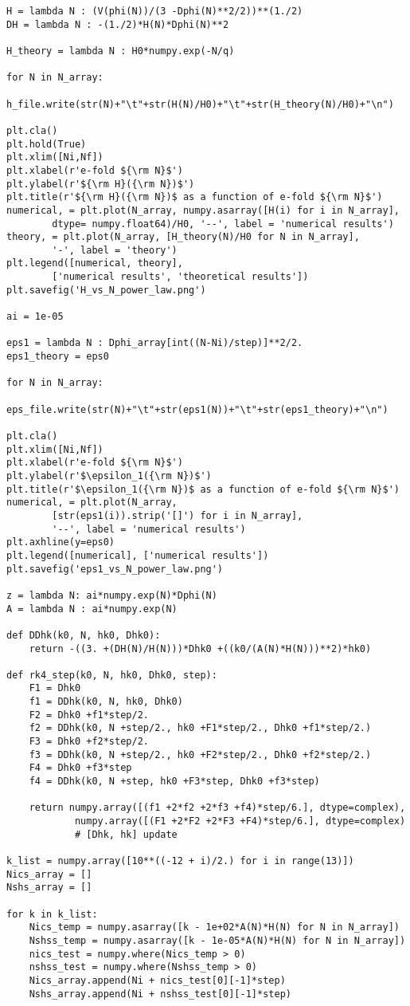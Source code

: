 \documentclass[12pt,a4paper,oneside]{book}
\begin{document}
\begin{appendices}
\begin{small}
\begin{verbatim}
H = lambda N : (V(phi(N))/(3 -Dphi(N)**2/2))**(1./2)
DH = lambda N : -(1./2)*H(N)*Dphi(N)**2

H_theory = lambda N : H0*numpy.exp(-N/q)

for N in N_array:
	h_file.write(str(N)+"\t"+str(H(N)/H0)+"\t"+str(H_theory(N)/H0)+"\n")

plt.cla()
plt.hold(True)
plt.xlim([Ni,Nf])
plt.xlabel(r'e-fold ${\rm N}$')
plt.ylabel(r'${\rm H}({\rm N})$')
plt.title(r'${\rm H}({\rm N})$ as a function of e-fold ${\rm N}$')
numerical, = plt.plot(N_array, numpy.asarray([H(i) for i in N_array], 
		dtype= numpy.float64)/H0, '--', label = 'numerical results')
theory, = plt.plot(N_array, [H_theory(N)/H0 for N in N_array], 
		'-', label = 'theory')
plt.legend([numerical, theory], 
		['numerical results', 'theoretical results'])
plt.savefig('H_vs_N_power_law.png')

ai = 1e-05

eps1 = lambda N : Dphi_array[int((N-Ni)/step)]**2/2.
eps1_theory = eps0

for N in N_array:
	eps_file.write(str(N)+"\t"+str(eps1(N))+"\t"+str(eps1_theory)+"\n")

plt.cla()
plt.xlim([Ni,Nf])
plt.xlabel(r'e-fold ${\rm N}$')
plt.ylabel(r'$\epsilon_1({\rm N})$')
plt.title(r'$\epsilon_1({\rm N})$ as a function of e-fold ${\rm N}$')
numerical, = plt.plot(N_array, 
		[str(eps1(i)).strip('[]') for i in N_array], 
		'--', label = 'numerical results')
plt.axhline(y=eps0)
plt.legend([numerical], ['numerical results'])
plt.savefig('eps1_vs_N_power_law.png')

z = lambda N: ai*numpy.exp(N)*Dphi(N)
A = lambda N : ai*numpy.exp(N)

def DDhk(k0, N, hk0, Dhk0):
    return -((3. +(DH(N)/H(N)))*Dhk0 +((k0/(A(N)*H(N)))**2)*hk0)

def rk4_step(k0, N, hk0, Dhk0, step):
    F1 = Dhk0
    f1 = DDhk(k0, N, hk0, Dhk0)
    F2 = Dhk0 +f1*step/2.
    f2 = DDhk(k0, N +step/2., hk0 +F1*step/2., Dhk0 +f1*step/2.)
    F3 = Dhk0 +f2*step/2.
    f3 = DDhk(k0, N +step/2., hk0 +F2*step/2., Dhk0 +f2*step/2.)
    F4 = Dhk0 +f3*step
    f4 = DDhk(k0, N +step, hk0 +F3*step, Dhk0 +f3*step)   

    return numpy.array([(f1 +2*f2 +2*f3 +f4)*step/6.], dtype=complex), 
    		numpy.array([(F1 +2*F2 +2*F3 +F4)*step/6.], dtype=complex) 
    		# [Dhk, hk] update

k_list = numpy.array([10**((-12 + i)/2.) for i in range(13)])
Nics_array = []
Nshs_array = []

for k in k_list:
    Nics_temp = numpy.asarray([k - 1e+02*A(N)*H(N) for N in N_array])
    Nshss_temp = numpy.asarray([k - 1e-05*A(N)*H(N) for N in N_array])
    nics_test = numpy.where(Nics_temp > 0)
    nshss_test = numpy.where(Nshss_temp > 0)
    Nics_array.append(Ni + nics_test[0][-1]*step)
    Nshs_array.append(Ni + nshss_test[0][-1]*step)


\end{verbatim}
\end{small}
\end{appendices}
\end{document}
